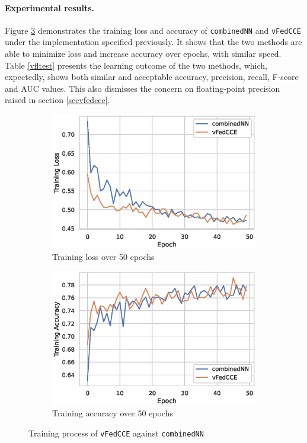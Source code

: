 \documentclass{article}
\begin{document}
\paragraph{Experimental results.} Figure \ref{fig:vflexp} demonstrates the training loss and accuracy of \texttt{combinedNN} and \texttt{vFedCCE} under the implementation specified previously. It shows that the two methods are able to minimize loss and increase accuracy over epochs, with similar speed. Table \ref{vfltest} presents the learning outcome of the two methods, which, expectedly, shows both similar and acceptable accuracy, precision, recall, F-score and AUC values. This also dismisses the concern on floating-point precision raised in section \ref{secvfedcce}.

\begin{figure}[ht]
\centering
\begin{subfigure}{.5\textwidth}
  \centering
  \includegraphics[width=\linewidth]{./images/vfl_train_loss.eps}
  \caption{Training loss over 50 epochs}
  \label{fig:vflloss}
\end{subfigure}%
\begin{subfigure}{.5\textwidth}
  \centering
  \includegraphics[width=\linewidth]{./images/vfl_train_acc.eps}
  \caption{Training accuracy over 50 epochs}
  \label{fig:vflacc}
\end{subfigure}
\caption{Training process of \texttt{vFedCCE} against \texttt{combinedNN}}
\label{fig:vflexp}
\end{figure}
\end{document}
